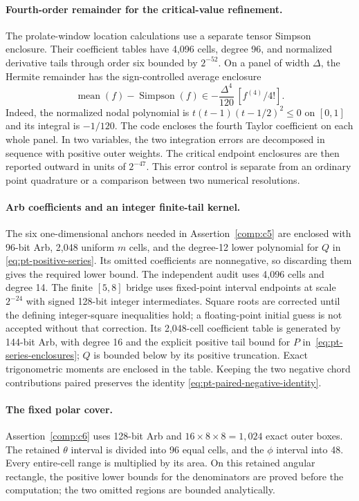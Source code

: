 \paragraph{Fourth-order remainder for the critical-value refinement.}
The prolate-window location calculations use a separate tensor
Simpson enclosure.  Their coefficient tables have 4,096 cells,
degree 96, and normalized derivative tails through order six bounded
by $2^{-52}$.  On a panel of width $\Delta$, the Hermite remainder
has the sign-controlled average enclosure
\[
 \operatorname{mean}(f)-\operatorname{Simpson}(f)
 \in -\frac{\Delta^4}{120}\,[f^{(4)}/4!].
\]
Indeed, the normalized nodal polynomial is
$t(t-1)(t-1/2)^2\leq0$ on $[0,1]$ and its integral is $-1/120$.
The code encloses the fourth Taylor coefficient on each whole panel.
In two variables, the two integration errors are decomposed in
sequence with positive outer weights.  The critical endpoint
enclosures are then reported outward in units of $2^{-47}$.
This error control is separate from an ordinary point quadrature
or a comparison between two numerical resolutions.

\paragraph{Arb coefficients and an integer finite-tail kernel.}
The six one-dimensional anchors needed in Assertion~\ref{comp:c5}
are enclosed with 96-bit Arb, 2,048 uniform $m$ cells, and the
degree-12 lower polynomial for $Q$ in
\eqref{eq:pt-positive-series}.  Its omitted coefficients are
nonnegative, so discarding them gives the required lower bound.
The independent audit uses 4,096 cells and degree 14.
The finite $[5,8]$ bridge uses fixed-point interval endpoints at
scale $2^{-24}$ with signed 128-bit integer intermediates.
Square roots are corrected until the defining integer-square
inequalities hold; a floating-point initial guess is not accepted
without that correction.  Its 2,048-cell coefficient table is
generated by 144-bit Arb, with degree 16 and the explicit positive
tail bound for $P$ in~\eqref{eq:pt-series-enclosures}; $Q$ is bounded
below by its positive truncation.  Exact trigonometric moments are
enclosed in the table.  Keeping the two negative chord contributions
paired preserves the identity
\eqref{eq:pt-paired-negative-identity}.

\paragraph{The fixed polar cover.}
Assertion~\ref{comp:c6} uses 128-bit Arb and
$16\times8\times8=1,024$ exact outer boxes.  The retained
$\theta$ interval is divided into 96 equal cells, and the
$\phi$ interval into 48.  Every entire-cell range is multiplied
by its area.  On this retained angular rectangle, the positive
lower bounds for the denominators are proved before the computation;
the two omitted regions are bounded analytically.

